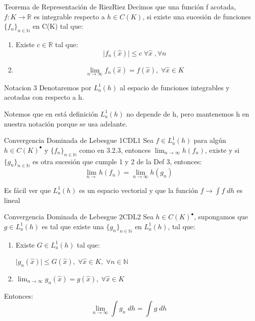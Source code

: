 \documentclass[12pt,a4paper]{book}
\providecommand{\abs}[1]{\lvert#1\rvert}
\providecommand{\conj}[1]{\lbrace#1\rbrace}
\providecommand{\Lah}{L_{a}^{1}(h)}
\begin{document}
\begin{definicion}{Teorema de Representación de Riez}{Riez}
Decimos que una función f acotada, $f:K\rightarrow \mathbb{R}$ es integrable respecto a $h\in C(K)$, si existe una sucesión de funciones $\conj{f_{n}}_{n\in\mathbb{N}}$ en C(K) tal que:
\begin{enumerate}
\item Existe $c\in\mathbb{R}$ tal que:
$$\abs{f_{n}(\widehat{x})}\leq c\;\forall\widehat{x}\;,\forall n$$
\item $$\lim_{n\rightarrow\infty} f_{n}(\widehat{x})=f(\widehat{x}),\; \forall \widehat{x}\in K$$
\end{enumerate}
\end{definicion}
\smallskip

\begin{notacion}{}{Notacion 3}
Denotaremos por $L_{a}^{1}(h)$ al espacio de funciones integrables y acotadas con respecto a h.
\end{notacion}
\smallskip

Notemos que en está definición $L_{a}^{1}(h)$ no depende de h, pero mantenemos h en nuestra notación porque se usa adelante.
\smallskip

\begin{teorema}{Convergencia Dominada de Lebesgue 1}{CDL1}
Sea $f\in L_{a}^{1}(h)$ para algún $h\in C(K)^{\bullet}$ y $\conj{f_{n}}_{n\in\mathbb{N}}$ como en 3.2.3, entonces $\lim_{n\rightarrow\infty}h(f_{n})$, existe y si $\conj{g_{n}}_{n\in\mathbb{N}}$ es otra sucesión que cumple 1 y 2 de la Def 3, entonces:
$$\lim_{n\rightarrow}h(f_{n})=\lim_{n\rightarrow\infty}h(g_{n})$$
\end{teorema} 
\smallskip

Es fácil ver que $\Lah$ es un espacio vectorial y que la función $f\rightarrow \int f\;dh$ es lineal
\smallskip

\begin{teorema}{Convergencia Dominada de Lebesgue 2}{CDL2}
Sea $h\in C(K)^{\bullet}$, supongamos que $g\in \Lah$ es tal que existe una $\conj{g_{n}}_{n\in\mathbb{N}}$ en $\Lah$, tal que:
\begin{enumerate}
\item Existe $G\in\Lah$ tal que:
\begin{center}
$\abs{g_{n}(\widehat{x})}\leq G(\widehat{x}),\;\forall\widehat{x}\in K,\;\forall n\in\mathbb{N}$
\end{center} 
\item $\lim_{n\rightarrow\infty}g_{n}(\widehat{x})=g(\widehat{x}),\;\forall\widehat{x}\in K$
\end{enumerate}
Entonces:
$$\lim_{n\rightarrow\infty}\int g_{n}\;dh=\int g\;dh$$
\end{teorema}
\smallskip
\end{document}
